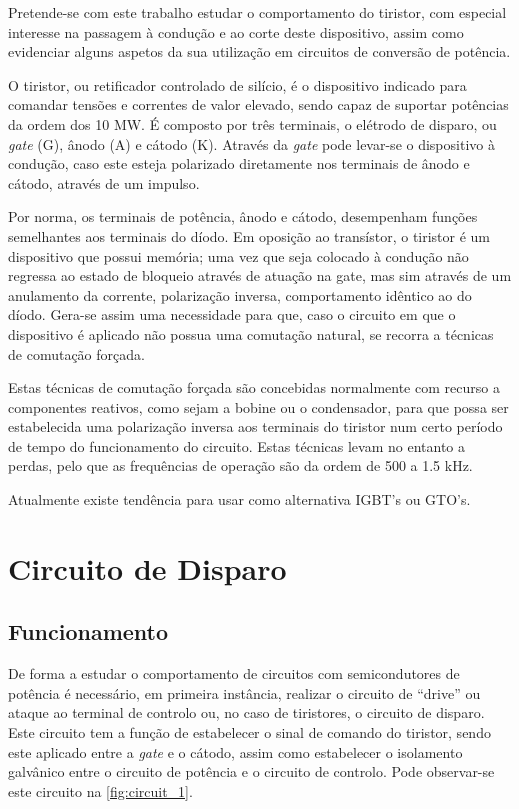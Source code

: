 \documentclass[a4paper,11pt]{article}
\numberwithin{equation}{section}
\begin{document}
Pretende-se com este trabalho estudar o comportamento do tiristor, com especial interesse na passagem à condução e ao corte deste dispositivo, assim como evidenciar alguns aspetos da sua utilização em circuitos de conversão de potência.

O tiristor, ou retificador controlado de silício, é o dispositivo indicado para comandar tensões e correntes de valor elevado, sendo capaz de suportar potências da ordem dos 10 MW. É composto por três terminais, o elétrodo de disparo, ou \textit{gate} (G), ânodo (A) e cátodo (K). Através da \textit{gate} pode levar-se o dispositivo à condução, caso este esteja polarizado diretamente nos terminais de ânodo e cátodo, através de um impulso. 

Por norma, os terminais de potência, ânodo e cátodo, desempenham funções semelhantes aos terminais do díodo. Em oposição ao transístor, o tiristor é um dispositivo que possui memória; uma vez que seja colocado à condução não regressa ao estado de bloqueio através de atuação na gate, mas sim através de um anulamento da corrente, polarização inversa, comportamento idêntico ao do díodo. Gera-se assim uma necessidade para que, caso o circuito em que o dispositivo é aplicado não possua uma comutação natural, se recorra a técnicas de comutação forçada.

Estas técnicas de comutação forçada são concebidas normalmente com recurso a componentes reativos, como sejam a bobine ou o condensador, para que possa ser estabelecida uma polarização inversa aos terminais do tiristor num certo período de tempo do funcionamento do circuito. Estas técnicas levam no entanto a perdas, pelo que as frequências de operação são da ordem de 500 a 1.5 kHz.

Atualmente existe tendência para usar como alternativa IGBT's ou GTO's.

\pagebreak

\section{Circuito de Disparo}

\subsection{Funcionamento}

De forma a estudar o comportamento de circuitos com semicondutores de potência é necessário, em primeira instância, realizar o circuito de “drive” ou ataque ao terminal de controlo ou, no caso de tiristores, o circuito de disparo. Este circuito tem a função de estabelecer o sinal de comando do tiristor, sendo este aplicado entre a \textit{gate} e o cátodo, assim como estabelecer o isolamento galvânico entre o circuito de potência e o circuito de controlo. Pode observar-se este circuito na \autoref{fig:circuit_1}.
\end{document}
